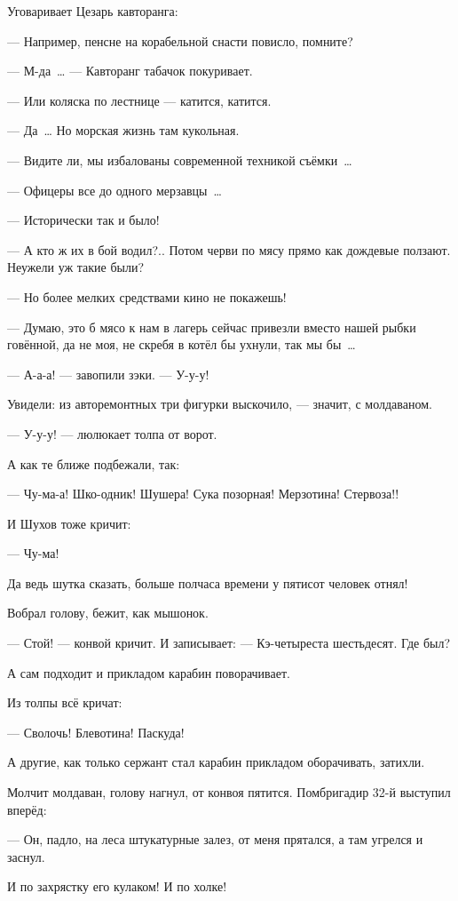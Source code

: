 Уговаривает Цезарь кавторанга:

--- Например, пенсне на корабельной снасти повисло, помните?

--- М-да~\dots{} --- Кавторанг табачок покуривает.

--- Или коляска по лестнице --- катится, катится.

--- Да~\dots{} Но морская жизнь там кукольная.

--- Видите ли, мы избалованы современной техникой съёмки~\dots{}

--- Офицеры все до одного мерзавцы~\dots{}

--- Исторически так и было!

--- А кто ж их в бой водил?.. Потом черви по мясу прямо как дождевые ползают. Неужели уж такие 
были?

--- Но более мелких средствами кино не покажешь!

--- Думаю, это б мясо к нам в лагерь сейчас привезли вместо нашей рыбки говённой, да не моя, не 
скребя в котёл бы ухнули, так мы бы~\dots{}

--- А-а-а! --- завопили зэки. --- У-у-у!

Увидели: из авторемонтных три фигурки выскочило, --- значит, с молдаваном.

--- У-у-у! --- люлюкает толпа от ворот.

А как те ближе подбежали, так:

--- Чу-ма-а! Шко-одник! Шушера! Сука позорная! Мерзотина! Стервоза!!

И Шухов тоже кричит:

--- Чу-ма!

Да ведь шутка сказать, больше полчаса времени у пятисот человек отнял!

Вобрал голову, бежит, как мышонок.

--- Стой! --- конвой кричит. И записывает: --- Кэ-четыреста шестьдесят. Где был?

А сам подходит и прикладом карабин поворачивает.

Из толпы всё кричат:

--- Сволочь! Блевотина! Паскуда!

А другие, как только сержант стал карабин прикладом оборачивать, затихли.

Молчит молдаван, голову нагнул, от конвоя пятится. Помбригадир 32-й выступил вперёд:

--- Он, падло, на леса штукатурные залез, от меня прятался, а там угрелся и заснул.

И по захрястку его кулаком! И по холке!

